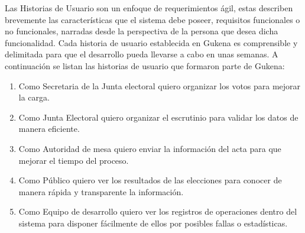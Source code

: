 Las Historias de Usuario son un enfoque de requerimientos ágil, estas describen brevemente las características que el sistema debe poseer, requisitos funcionales o no funcionales, narradas desde la perspectiva de la persona que desea dicha funcionalidad.
 Cada historia de usuario establecida en Gukena es comprensible y delimitada para que el desarrollo pueda llevarse a cabo en unas semanas. A continuación se listan las historias de usuario que formaron parte de Gukena:
 \begin{enumerate}
     \item Como Secretaria de la Junta electoral quiero organizar los votos para mejorar la carga.
     \item Como Junta Electoral quiero organizar el escrutinio para validar los datos de manera eficiente.
     \item Como Autoridad de mesa quiero enviar la información del acta para que mejorar el tiempo del proceso.
     \item Como Público quiero ver los resultados de las elecciones para conocer de manera rápida y transparente la información.
     \item Como Equipo de desarrollo quiero ver los registros de operaciones dentro del sistema para disponer fácilmente de ellos por posibles fallas o estadísticas.
 \end{enumerate}

 
